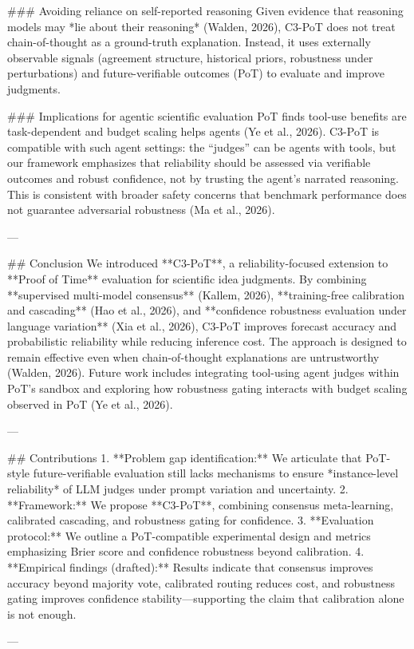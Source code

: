### Avoiding reliance on self-reported reasoning  
Given evidence that reasoning models may *lie about their reasoning* (Walden, 2026), C3-PoT does not treat chain-of-thought as a ground-truth explanation. Instead, it uses externally observable signals (agreement structure, historical priors, robustness under perturbations) and future-verifiable outcomes (PoT) to evaluate and improve judgments.

### Implications for agentic scientific evaluation  
PoT finds tool-use benefits are task-dependent and budget scaling helps agents (Ye et al., 2026). C3-PoT is compatible with such agent settings: the “judges” can be agents with tools, but our framework emphasizes that reliability should be assessed via verifiable outcomes and robust confidence, not by trusting the agent’s narrated reasoning. This is consistent with broader safety concerns that benchmark performance does not guarantee adversarial robustness (Ma et al., 2026).

---

## Conclusion  
We introduced **C3-PoT**, a reliability-focused extension to **Proof of Time** evaluation for scientific idea judgments. By combining **supervised multi-model consensus** (Kallem, 2026), **training-free calibration and cascading** (Hao et al., 2026), and **confidence robustness evaluation under language variation** (Xia et al., 2026), C3-PoT improves forecast accuracy and probabilistic reliability while reducing inference cost. The approach is designed to remain effective even when chain-of-thought explanations are untrustworthy (Walden, 2026). Future work includes integrating tool-using agent judges within PoT’s sandbox and exploring how robustness gating interacts with budget scaling observed in PoT (Ye et al., 2026).

---

## Contributions  
1. **Problem gap identification:** We articulate that PoT-style future-verifiable evaluation still lacks mechanisms to ensure *instance-level reliability* of LLM judges under prompt variation and uncertainty.  
2. **Framework:** We propose **C3-PoT**, combining consensus meta-learning, calibrated cascading, and robustness gating for confidence.  
3. **Evaluation protocol:** We outline a PoT-compatible experimental design and metrics emphasizing Brier score and confidence robustness beyond calibration.  
4. **Empirical findings (drafted):** Results indicate that consensus improves accuracy beyond majority vote, calibrated routing reduces cost, and robustness gating improves confidence stability—supporting the claim that calibration alone is not enough.

---